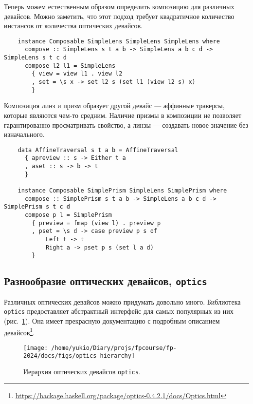 Теперь можем естественным образом определить композицию для различных девайсов.
Можно заметить, что этот подход требует квадратичное количество инстансов от количества оптических девайсов.

\begin{verbatim}
    instance Composable SimpleLens SimpleLens SimpleLens where
      compose :: SimpleLens s t a b -> SimpleLens a b c d -> SimpleLens s t c d
      compose l2 l1 = SimpleLens
        { view = view l1 . view l2
        , set = \s x -> set l2 s (set l1 (view l2 s) x)
        }
\end{verbatim}

Композиция линз и призм образует другой девайс --- аффинные траверсы, которые являются чем-то средним.
Наличие призмы в композиции не позволяет гарантированно просматривать свойство, а линзы --- создавать новое значение без изначального.
\begin{verbatim}
    data AffineTraversal s t a b = AffineTraversal
      { apreview :: s -> Either t a
      , aset :: s -> b -> t
      }

    instance Composable SimplePrism SimpleLens SimplePrism where
      compose :: SimplePrism s t a b -> SimpleLens a b c d -> SimplePrism s t c d
      compose p l = SimplePrism
        { preview = fmap (view l) . preview p
        , pset = \s d -> case preview p s of
            Left t -> t
            Right a -> pset p s (set l a d)
        }
\end{verbatim}


\subsection{Разнообразие оптических девайсов, \texttt{optics}} \label{subsec:optics}

Различных оптических девайсов можно придумать довольно много.
Библиотека \texttt{optics} предоставляет абстрактный интерфейс для самых популярных из них (рис.~\ref{fig:optics-hierarchy}).
Она имеет прекрасную документацию с подробным описанием девайсов\footnote{\url{https://hackage.haskell.org/package/optics-0.4.2.1/docs/Optics.html}}.

\begin{figure}
    \centering
    \texttt{[image: /home/yukio/Diary/projs/fpcourse/fp-2024/docs/figs/optics-hierarchy]}
    \caption{Иерархия оптических девайсов \texttt{optics}.}
    \label{fig:optics-hierarchy}
\end{figure}

